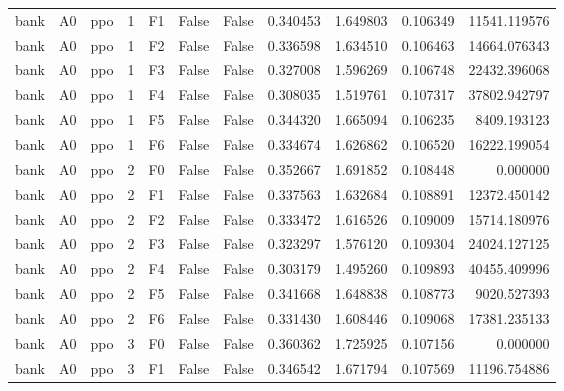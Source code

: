 \begin{tabular}{lllrlllrrrr}
      bank &      A0 &       ppo &     1 &  F1 &           False &            False &  0.340453 &  1.649803 & 0.106349 &     11541.119576 \\
      bank &      A0 &       ppo &     1 &  F2 &           False &            False &  0.336598 &  1.634510 & 0.106463 &     14664.076343 \\
      bank &      A0 &       ppo &     1 &  F3 &           False &            False &  0.327008 &  1.596269 & 0.106748 &     22432.396068 \\
      bank &      A0 &       ppo &     1 &  F4 &           False &            False &  0.308035 &  1.519761 & 0.107317 &     37802.942797 \\
      bank &      A0 &       ppo &     1 &  F5 &           False &            False &  0.344320 &  1.665094 & 0.106235 &      8409.193123 \\
      bank &      A0 &       ppo &     1 &  F6 &           False &            False &  0.334674 &  1.626862 & 0.106520 &     16222.199054 \\
      bank &      A0 &       ppo &     2 &  F0 &           False &            False &  0.352667 &  1.691852 & 0.108448 &         0.000000 \\
      bank &      A0 &       ppo &     2 &  F1 &           False &            False &  0.337563 &  1.632684 & 0.108891 &     12372.450142 \\
      bank &      A0 &       ppo &     2 &  F2 &           False &            False &  0.333472 &  1.616526 & 0.109009 &     15714.180976 \\
      bank &      A0 &       ppo &     2 &  F3 &           False &            False &  0.323297 &  1.576120 & 0.109304 &     24024.127125 \\
      bank &      A0 &       ppo &     2 &  F4 &           False &            False &  0.303179 &  1.495260 & 0.109893 &     40455.409996 \\
      bank &      A0 &       ppo &     2 &  F5 &           False &            False &  0.341668 &  1.648838 & 0.108773 &      9020.527393 \\
      bank &      A0 &       ppo &     2 &  F6 &           False &            False &  0.331430 &  1.608446 & 0.109068 &     17381.235133 \\
      bank &      A0 &       ppo &     3 &  F0 &           False &            False &  0.360362 &  1.725925 & 0.107156 &         0.000000 \\
      bank &      A0 &       ppo &     3 &  F1 &           False &            False &  0.346542 &  1.671794 & 0.107569 &     11196.754886 \\

\end{tabular}
